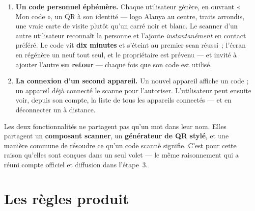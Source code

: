 \begin{enumerate}[leftmargin=1.6em]
  \item \textbf{Un code personnel éphémère.} Chaque utilisateur génère, en ouvrant
        « Mon code », un QR à son identité --- logo Alanya au centre, traits arrondis,
        une vraie carte de visite plutôt qu'un carré noir et blanc. Le scanner d'un autre
        utilisateur reconnaît la personne et l'ajoute \emph{instantanément} en contact
        préféré. Le code vit \textbf{dix minutes} et s'éteint au premier scan réussi~;
        l'écran en régénère un neuf tout seul, et le propriétaire est prévenu --- et
        invité à ajouter l'autre \textbf{en retour} --- chaque fois que son code est
        utilisé.
  \item \textbf{La connexion d'un second appareil.} Un nouvel appareil affiche un code ; un
        appareil déjà connecté le scanne pour l'autoriser. L'utilisateur peut ensuite voir,
        depuis son compte, la liste de tous les appareils connectés --- et en déconnecter un
        à distance.
\end{enumerate}

\begin{note}
Les deux fonctionnalités ne partagent pas qu'un mot dans leur nom. Elles partagent un
\textbf{composant scanner}, un \textbf{générateur de QR stylé}, et une manière commune de
résoudre ce qu'un code scanné signifie. C'est pour cette raison qu'elles sont conçues dans
un seul volet --- le même raisonnement qui a réuni compte officiel et diffusion dans
l'étape~3.
\end{note}

\section{Les règles produit}

